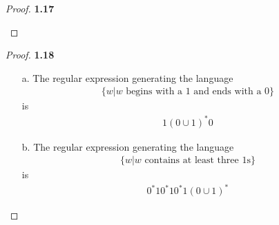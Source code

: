 \documentclass[11pt]{article}
\theoremstyle{definition}
\begin{document}
\begin{proof}{\textbf{1.17}}
\begin{itemize}
\begin{figure}[H]
\end{figure}
\end{itemize}
\end{proof}
\cleardoublepage
\begin{proof}{\textbf{1.18}}
\begin{itemize}
    \item [a.] The regular expression generating the language
    \begin{align*}
        \{w | w\text{ begins with a 1 and ends with a 0}\}
    \end{align*}
    is 
    \begin{align*}
        1(0 \cup 1)^*0
    \end{align*}
    \item [b.] The regular expression generating the language
    \begin{align*}
        \{w | w\text{ contains at least three 1s}\}
    \end{align*}
    is 
    \begin{align*}
        0^*10^*10^*1(0 \cup 1)^*
    \end{align*}
\end{itemize}
\end{proof}
\cleardoublepage
\end{document}
